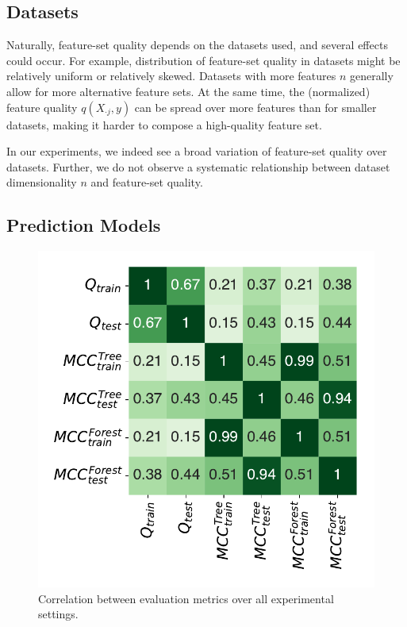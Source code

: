 \documentclass[conference]{IEEEtran}
\theoremstyle{definition}
\begin{document}
\subsection{Datasets}

Naturally, feature-set quality depends on the datasets used, and several effects could occur.
For example, distribution of feature-set quality in datasets might be relatively uniform or relatively skewed.
Datasets with more features $n$ generally allow for more alternative feature sets.
At the same time, the (normalized) feature quality $q(X_{\cdot{}j},y)$ can be spread over more features than for smaller datasets, making it harder to compose a high-quality feature set.

In our experiments, we indeed see a broad variation of feature-set quality over datasets.
Further, we do not observe a systematic relationship between dataset dimensionality $n$ and feature-set quality.

\subsection{Prediction Models}

\begin{figure}[t]
	\centering
	\includegraphics[width=0.7\columnwidth, trim=0 20 0 15, clip]{plots/evaluation-metrics-correlation.pdf}
	\caption{Correlation between evaluation metrics over all experimental settings.}
	\label{fig:evaluation-metrics-correlation}
\end{figure}
\end{document}
